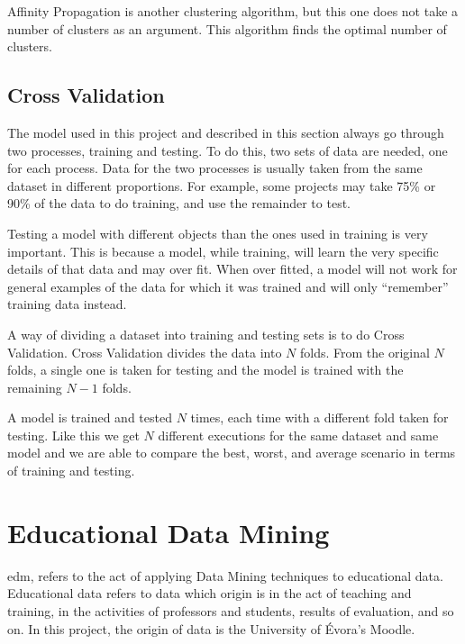 Affinity Propagation is another clustering algorithm, but this one does not
take a number of clusters as an argument. This algorithm finds the optimal
number of clusters.~\cite{book_ml,book_dm_practical}

\subsection{Cross Validation}
\label{sec:cross_val}

The model used in this project and described in this section always go through
two processes, training and testing. To do this, two sets of data are needed,
one for each process. Data for the two processes is usually taken from the same
dataset in different proportions. For example, some projects may take 75\% or
90\% of the data to do training, and use the remainder to test.

Testing a model with different objects than the ones used in training is very
important. This is because a model, while training, will learn the very
specific details of that data and may over fit. When over fitted, a model will
not work for general examples of the data for which it was trained and will
only ``remember'' training data instead.

A way of dividing a dataset into training and testing sets is to do Cross
Validation. Cross Validation divides the data into $ N $ folds. From the
original $ N $ folds, a single one is taken for testing and the model is
trained with the remaining $ N - 1 $ folds.

A model is trained and tested $ N $ times, each time with a different fold
taken for testing. Like this we get $ N $ different executions for the same
dataset and same model and we are able to compare the best, worst, and average
scenario in terms of training and testing.~\cite{book_dm_practical}

\section{Educational Data Mining}

\acrfull{edm}, refers to the act of applying Data Mining techniques to
educational data. Educational data refers to data which origin is in the act of
teaching and training, in the activities of professors and students, results of
evaluation, and so on. In this project, the origin of data is the University of
Évora's Moodle.

